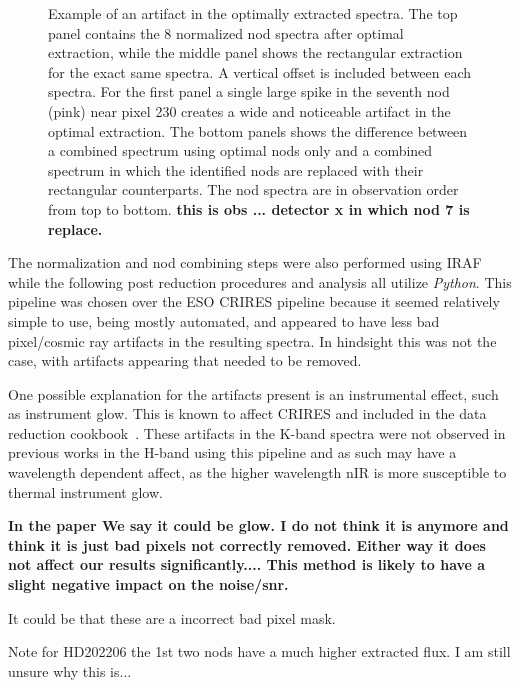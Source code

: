 \begin{figure}
    \caption{Example of an artifact in the optimally extracted spectra. The top panel contains the 8 normalized nod spectra after optimal extraction, while the middle panel shows the rectangular extraction for the exact same spectra. A vertical offset is included between each spectra. For the first panel a single large spike in the seventh nod (pink) near pixel 230 creates a wide and noticeable artifact in the optimal extraction. The bottom panels shows the difference between a combined spectrum using optimal nods only and a combined spectrum in which the identified nods are replaced with their rectangular counterparts. The nod spectra are in observation order from top to bottom.  \textbf{this is obs ... detector x in which nod 7 is replace.}}
    \label{fig:badpixelreplacement}
\end{figure}




The normalization and nod combining steps were also performed using IRAF while the following post reduction procedures and analysis all utilize \emph{Python}. This pipeline was chosen over the ESO CRIRES pipeline because it seemed relatively simple to use, being mostly automated, and appeared to have less bad pixel/cosmic ray artifacts in the resulting spectra. In hindsight this was not the case, with artifacts appearing that needed to be removed. 

One possible explanation for the artifacts present is an instrumental effect, such as instrument glow. This is known to affect CRIRES and included in the data reduction cookbook~\citep{smoker_very_2012}. These artifacts in the K-band spectra were not observed in previous works in the H-band using this pipeline and as such may have a wavelength dependent affect, as the higher wavelength nIR is more susceptible to thermal instrument glow.



\textbf{In the paper We say it could be glow. I do not think it is anymore and think it is just bad pixels not correctly removed. Either way it does not affect our results significantly....
This method is likely to have a slight negative impact on the noise/snr.}

It could be that these are a incorrect bad pixel mask.


Note for HD202206 the 1st two nods have a much higher extracted flux. I am still unsure why this is...


